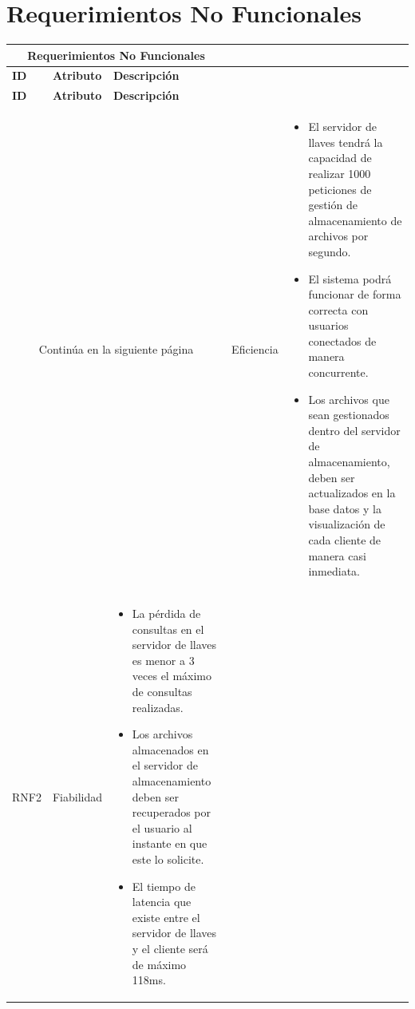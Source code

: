 \section{Requerimientos No Funcionales }
\begin{longtable}{| p{1.5cm} | p{3cm} | p{11cm} |}

\hline
\multicolumn{3}{|c|}{\textbf{Requerimientos No Funcionales}} \\ \hline
\textbf{ID} &  \textbf{Atributo} & \textbf{Descripción}\\
\hline \hline
\endfirsthead

\hline
\textbf{ID} &  \textbf{Atributo} & \textbf{Descripción}\\
\hline \hline
\endhead

\multicolumn{3}{|c|}{Continúa en la siguiente página}
\endfoot

\endlastfoot

RNF1 & Eficiencia &  \begin{itemize} 
   \item El servidor de llaves tendrá la capacidad de realizar 1000 peticiones de gestión de almacenamiento de archivos por segundo. 
   \item El sistema podrá funcionar de forma correcta con usuarios conectados de manera concurrente. 
   \item Los archivos que sean gestionados dentro del servidor de almacenamiento, deben ser actualizados en la base datos y la visualización de cada cliente de manera casi inmediata. 
  \end{itemize}
\\ \hline

RNF2 & Fiabilidad &  \begin{itemize} 
  \item La pérdida de consultas en el servidor de llaves es menor a 3 veces el máximo de consultas realizadas. 
   \item Los archivos almacenados en el servidor de almacenamiento deben ser recuperados por el usuario al instante en que este lo solicite. 
   \item El tiempo de latencia que existe entre el servidor de llaves y el cliente será de máximo 118ms. 
 \end{itemize}
\\ \hline


\end{longtable}
